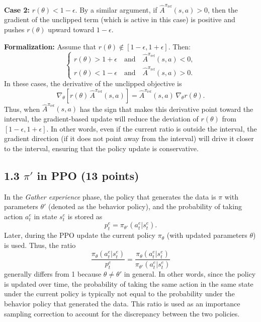 \textbf{Case 2:} $r(\theta)<1-\epsilon$. By a similar argument, if $\hat{A}^{\pi_{\text{ref}}}(s,a)>0$, then the gradient of the unclipped term (which is active in this case) is positive and pushes $r(\theta)$ upward toward $1-\epsilon$.

\textbf{Formalization:} Assume that $r(\theta)\notin[1-\epsilon,1+\epsilon]$. Then:
\[
\begin{cases}
  r(\theta) > 1+\epsilon \quad \text{and} \quad \hat{A}^{\pi_{\text{ref}}}(s,a)<0,\\[1mm]
  r(\theta) < 1-\epsilon \quad \text{and} \quad \hat{A}^{\pi_{\text{ref}}}(s,a)>0.
\end{cases}
\]
In these cases, the derivative of the unclipped objective is
\[
  \nabla_\theta \left[ r(\theta)\,\hat{A}^{\pi_{\text{ref}}}(s,a) \right] = \hat{A}^{\pi_{\text{ref}}}(s,a)\, \nabla_\theta r(\theta).
\]
Thus, when $\hat{A}^{\pi_{\text{ref}}}(s,a)$ has the sign that makes this derivative point toward the interval, the gradient-based update will reduce the deviation of $r(\theta)$ from $[1-\epsilon,1+\epsilon]$. In other words, even if the current ratio is outside the interval, the gradient direction (if it does not point away from the interval) will drive it closer to the interval, ensuring that the policy update is conservative.

\vspace{2mm}

\subsection*{1.3 $\pi'$ in PPO (13 points)}

In the \emph{Gather experience} phase, the policy that generates the data is $\pi$ with parameters $\theta'$ (denoted as the behavior policy), and the probability of taking action $a_t^e$ in state $s_t^e$ is stored as 
\[
  p_t^e = \pi_{\theta'}(a_t^e|s_t^e).
\]
Later, during the PPO update the current policy $\pi_{\theta}$ (with updated parameters $\theta$) is used. Thus, the ratio
\[
  \frac{\pi_{\theta}(a_t^e|s_t^e)}{p_t^e} = \frac{\pi_{\theta}(a_t^e|s_t^e)}{\pi_{\theta'}(a_t^e|s_t^e)}
\]
generally differs from 1 because $\theta \neq \theta'$ in general. In other words, since the policy is updated over time, the probability of taking the same action in the same state under the current policy is typically not equal to the probability under the behavior policy that generated the data. This ratio is used as an importance sampling correction to account for the discrepancy between the two policies.

